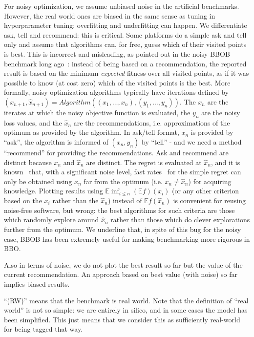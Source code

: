 \documentclass{article}
\def\E{\mathbb{E}}
\begin{document}
For noisy optimization, we assume unbiased noise in the artificial benchmarks. However, the real world ones are biased in the same sense as tuning in hyperparameter tuning: overfitting and underfitting can happen.
We differentiate ask, tell and recommend: this is critical. Some platforms do a simple ask and tell only and assume that
algorithms can, for free, guess which of their visited points is best. This is incorrect and misleading, as pointed out
in the noisy BBOB benchmark long ago~\cite{bbobissue1,bbobissue2,bbobissue3,bbobissue4}: instead of being based on a recommendation, the reported result is based on the minimum { {\em{expected}} fitness} over all visited points, as if it was possible to know (at cost zero) which of the visited points is the best.
More formally, noisy optimization algorithms typically have iterations defined by $(x_{n+1},\hat
x_{n+1})=Algorithm((x_1,\dots,x_n),(y_1,\dots,y_n))$. The $x_n$ are the iterates at which the noisy objective function
is evaluated, the $y_n$ are the noisy loss values, and the $\hat x_n$ are the recommendations, i.e. approximations of
the optimum as provided by the algorithm. In ask/tell format, $x_n$ is provided by ``ask'', the algorithm is informed of
$(x_n,y_n)$ by ``tell'' - and we need a method ``recommend'' for providing the recommendations. Ask and recommend are
distinct because $x_n$ and $\hat x_n$ are distinct. The regret is evaluated at $\hat x_n$, and it is
known~\cite{fabian,decocknoise} that, with a significant noise level, fast rates~\cite{fabian,chen1988} for the simple regret can only be obtained using $x_n$ far from the optimum (i.e. $x_n\neq \hat x_n$) for acquiring knowledge. Plotting results using $\E\inf_{i\leq n}(\E f)(x_i)$ (or any other criterion based on the $x_i$ rather than the $\hat x_n$) instead of $\E f(\hat x_n)$ is convenient for reusing noise-free software, but wrong: the best algorithms for such criteria are those which randomly explore around $\hat x_n$ rather than those which do clever explorations further from the optimum. We underline that, in spite of this bug for the noisy case, BBOB has been extremely useful for making benchmarking more rigorous in BBO.

Also in terms of noise, we do not plot the best result so far but the value of the current recommendation. An approach based on best value (with noise) so far implies biased results.

``(RW)'' means that the benchmark is real world. Note that the definition of ``real world'' is not so simple: we are entirely in silico, and in some cases the model has been simplified. This just means that we consider this as sufficiently real-world for being tagged that way.
\end{document}
